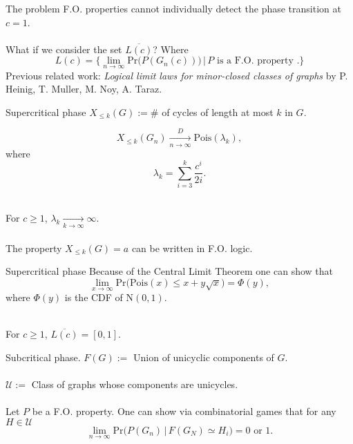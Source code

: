 \documentclass[handout, 11pt]{beamer}
\newcommand{\Ln}{\lim\limits_{n\to \infty}}
\begin{document}
\begin{frame}{The problem}
	F.O. properties cannot individually
	detect the phase transition
	at $c=1$.\\~\\
	What if we consider the set $\overline{L(c)}$? Where
	\[L(c)=\{ \Ln \mathrm{Pr}\big( 
	P(G_n(c))\big) \, | \, P \text{ is a F.O. property }.	\}
	\]
	Previous related work:
	\textit{Logical limit laws for minor-closed classes of graphs}
	by P. Heinig, T. Muller, M. Noy, A. Taraz. 
	
\end{frame}

\begin{frame}{Supercritical phase}
$X_{\leq k}(G):= \#$ of cycles of length at most $k$ in $G$.
\begin{theorem}
	\[
	X_{\leq k}(G_n)\xrightarrow[n\to \infty]{D}
	\mathrm{Pois}(\lambda_k),
	\]
	where
	\[
	\lambda_k=\sum_{i=3}^{k} \frac{c^i}{2i}.
	\]
\end{theorem}
~\\
For $c\geq 1$, $\lambda_k \xrightarrow[k\to \infty]{} \infty$.
\\~\\
The property $X_{\leq k}(G)=a$ can be written in F.O. logic. 
\end{frame}  

\begin{frame}{Supercritical phase}
	Because of the Central Limit Theorem one can show that
	\[
	\lim\limits_{x\to \infty}
	\mathrm{Pr}\big( \mathrm{Pois}(x)\leq x + y\sqrt{x}\big) 
	= \Phi(y),	
	\]
	where $\Phi(y)$ is the CDF of $\mathrm{N}(0,1)$.
	\\~\\
	\begin{theorem}
		For $c\geq 1$, $\overline{L(c)}=[0,1]$.
	\end{theorem}
\end{frame}

\begin{frame}{Subcritical phase.}
 $F(G):=$ Union of unicyclic components of $G$.\\~\\
 $\mathcal{U}:=$ Class of graphs whose components are unicycles.\\~\\
Let $P$ be a F.O. property. One
can show via combinatorial games that for any $H\in \mathcal{U}$
\[
\Ln \mathrm{Pr}\big( P(G_n) \,|\, F(G_N)\simeq H_i \big)
= 0 \text{ or } 1.
\]
% 
\end{frame}
\end{document}
